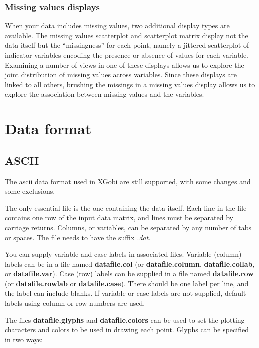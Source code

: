 \documentclass[11pt]{article}
\begin{document}
\subsubsection{Missing values displays}
\label{slbl:MissingData}

When your data includes missing values, two additional display types
are available.  The missing values scatterplot and scatterplot matrix
display not the data itself but the ``missingness'' for each point, namely
a jittered scatterplot of indicator variables encoding the presence or
absence of values for each variable.  Examining a number of views in one
of these displays allows us to explore the joint distribution of missing
values across variables.  Since these displays are linked to all others,
brushing the missings in a missing values display allows us to explore
the association between missing values and the variables.

\section{Data format}
\label{slbl:DataFormat}

\subsection {ASCII}
\label{slbl:ASCII}

The ascii data format used in XGobi are still
supported, with some changes and some exclusions.

The only essential file is the one containing the data itself.  Each
line in the file contains one row of the input data matrix, and lines
must be separated by carriage returns.  Columns, or variables, can be
separated by any number of tabs or spaces.  The file needs to have the
suffix {\em .dat}.

You can supply variable and case labels in associated files.
Variable (column) labels can be in a file named {\bf datafile.col}
(or {\bf datafile.column}, {\bf datafile.collab}, or {\bf
datafile.var}).  Case (row) labels can be supplied in a file named
{\bf datafile.row} (or {\bf data\-file.row\-lab} or {\bf
data\-file.case}).  There should be one label per line, and the label
can include blanks.  If variable or case labels are not supplied,
default labels using column or row numbers are used.

The files {\bf datafile.glyphs} and {\bf datafile.colors} can be
used to set the plotting characters and colors to be used in
drawing each point.  Glyphs can be specified in two ways:
\end{document}

